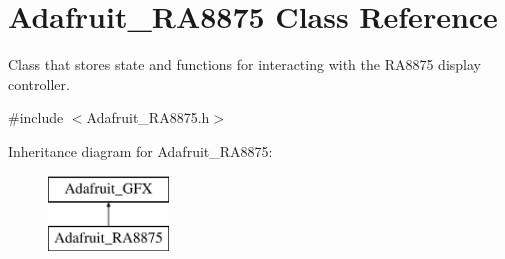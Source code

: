 \hypertarget{class_adafruit___r_a8875}{}\section{Adafruit\+\_\+\+R\+A8875 Class Reference}
\label{class_adafruit___r_a8875}


Class that stores state and functions for interacting with the R\+A8875 display controller.  




{\ttfamily \#include $<$Adafruit\+\_\+\+R\+A8875.\+h$>$}

Inheritance diagram for Adafruit\+\_\+\+R\+A8875\+:\begin{figure}[H]
\begin{center}
\leavevmode
\includegraphics[height=2.000000cm]{class_adafruit___r_a8875}
\end{center}
\end{figure}
